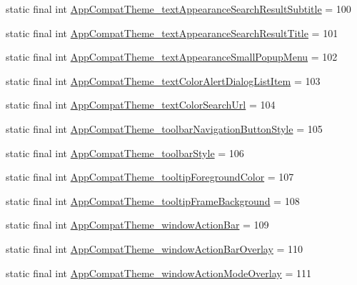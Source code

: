 \begin{DoxyCompactItemize}
\item 
static final int \mbox{\hyperlink{classandroid_1_1support_1_1design_1_1R_1_1styleable_ae732301800acf56ecc14851120c3f353}{App\+Compat\+Theme\+\_\+text\+Appearance\+Search\+Result\+Subtitle}} = 100
\item 
static final int \mbox{\hyperlink{classandroid_1_1support_1_1design_1_1R_1_1styleable_a78d4bdf68398e78aba7de8f729f04608}{App\+Compat\+Theme\+\_\+text\+Appearance\+Search\+Result\+Title}} = 101
\item 
static final int \mbox{\hyperlink{classandroid_1_1support_1_1design_1_1R_1_1styleable_ace3bf088ebfa5114c2b61e9549a48364}{App\+Compat\+Theme\+\_\+text\+Appearance\+Small\+Popup\+Menu}} = 102
\item 
static final int \mbox{\hyperlink{classandroid_1_1support_1_1design_1_1R_1_1styleable_a2465ceaacdc9564a939edc3ee48bd2b1}{App\+Compat\+Theme\+\_\+text\+Color\+Alert\+Dialog\+List\+Item}} = 103
\item 
static final int \mbox{\hyperlink{classandroid_1_1support_1_1design_1_1R_1_1styleable_a7d63bc68d23f5dc7d751b941c5e33e83}{App\+Compat\+Theme\+\_\+text\+Color\+Search\+Url}} = 104
\item 
static final int \mbox{\hyperlink{classandroid_1_1support_1_1design_1_1R_1_1styleable_a92c316127259a6fb3a0452630c4bf70d}{App\+Compat\+Theme\+\_\+toolbar\+Navigation\+Button\+Style}} = 105
\item 
static final int \mbox{\hyperlink{classandroid_1_1support_1_1design_1_1R_1_1styleable_a578439cfaa5e75a26e319935c8aeea2f}{App\+Compat\+Theme\+\_\+toolbar\+Style}} = 106
\item 
static final int \mbox{\hyperlink{classandroid_1_1support_1_1design_1_1R_1_1styleable_a87883d9b44e4da6f3086c1f2912f52a1}{App\+Compat\+Theme\+\_\+tooltip\+Foreground\+Color}} = 107
\item 
static final int \mbox{\hyperlink{classandroid_1_1support_1_1design_1_1R_1_1styleable_aa4e1632a24c4272e85b9c1168eb8b1ef}{App\+Compat\+Theme\+\_\+tooltip\+Frame\+Background}} = 108
\item 
static final int \mbox{\hyperlink{classandroid_1_1support_1_1design_1_1R_1_1styleable_ab906c650ea56cb13ba044bfae2b0c5a8}{App\+Compat\+Theme\+\_\+window\+Action\+Bar}} = 109
\item 
static final int \mbox{\hyperlink{classandroid_1_1support_1_1design_1_1R_1_1styleable_a71829623397abbbbab51409511d16792}{App\+Compat\+Theme\+\_\+window\+Action\+Bar\+Overlay}} = 110
\item 
static final int \mbox{\hyperlink{classandroid_1_1support_1_1design_1_1R_1_1styleable_a84331b6298d479f0afe91973e5c8147a}{App\+Compat\+Theme\+\_\+window\+Action\+Mode\+Overlay}} = 111

\end{DoxyCompactItemize}
